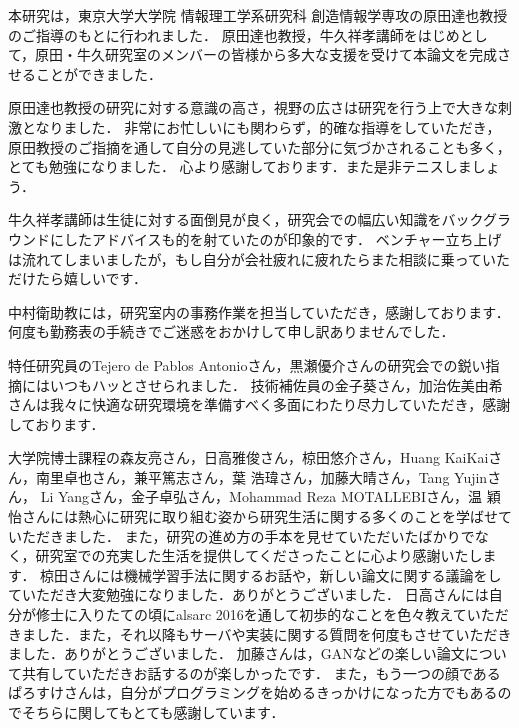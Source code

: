 
本研究は，東京大学大学院 情報理工学系研究科 創造情報学専攻の原田達也教授のご指導のもとに行われました．
原田達也教授，牛久祥孝講師をはじめとして，原田・牛久研究室のメンバーの皆様から多大な支援を受けて本論文を完成させることができました．

原田達也教授の研究に対する意識の高さ，視野の広さは研究を行う上で大きな刺激となりました．
非常にお忙しいにも関わらず，的確な指導をしていただき，原田教授のご指摘を通して自分の見逃していた部分に気づかされることも多く，とても勉強になりました．
心より感謝しております．また是非テニスしましょう．

牛久祥孝講師は生徒に対する面倒見が良く，研究会での幅広い知識をバックグラウンドにしたアドバイスも的を射ていたのが印象的です．
ベンチャー立ち上げは流れてしまいましたが，もし自分が会社疲れに疲れたらまた相談に乗っていただけたら嬉しいです．

中村衛助教には，研究室内の事務作業を担当していただき，感謝しております．
何度も勤務表の手続きでご迷惑をおかけして申し訳ありませんでした．

特任研究員のTejero de Pablos Antonioさん，黒瀬優介さんの研究会での鋭い指摘にはいつもハッとさせられました．
技術補佐員の金子葵さん，加治佐美由希さんは我々に快適な研究環境を準備すべく多面にわたり尽力していただき，感謝しております．


大学院博士課程の森友亮さん，日高雅俊さん，椋田悠介さん，Huang KaiKaiさん，南里卓也さん，兼平篤志さん，葉 浩瑋さん，加藤大晴さん，Tang Yujinさん，
Li Yangさん，金子卓弘さん，Mohammad Reza MOTALLEBIさん，温 穎怡さんには熱心に研究に取り組む姿から研究生活に関する多くのことを学ばせていただきました．
また，研究の進め方の手本を見せていただいたばかりでなく，研究室での充実した生活を提供してくださったことに心より感謝いたします．
椋田さんには機械学習手法に関するお話や，新しい論文に関する議論をしていただき大変勉強になりました．ありがとうございました．
日高さんには自分が修士に入りたての頃にalsarc 2016を通して初歩的なことを色々教えていただきました．また，それ以降もサーバや実装に関する質問を何度もさせていただきました．ありがとうございました．
加藤さんは，GANなどの楽しい論文について共有していただきお話するのが楽しかったです．
また，もう一つの顔であるぱろすけさんは，自分がプログラミングを始めるきっかけになった方でもあるのでそちらに関してもとても感謝しています．

